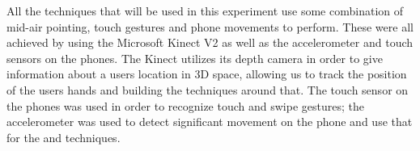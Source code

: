 All the techniques that will be used in this experiment use some combination of mid-air pointing, touch gestures and phone movements to perform. 
These were all achieved by using the Microsoft Kinect V2 as well as the accelerometer and touch sensors on the phones. 
The Kinect utilizes its depth camera in order to give information about a users location in 3D space, allowing us to track the position of the users hands and building the techniques around that. 
The touch sensor on the phones was used in order to recognize touch and swipe gestures; the accelerometer was used to detect significant movement on the phone and use that for the \tilt and \throw techniques. 